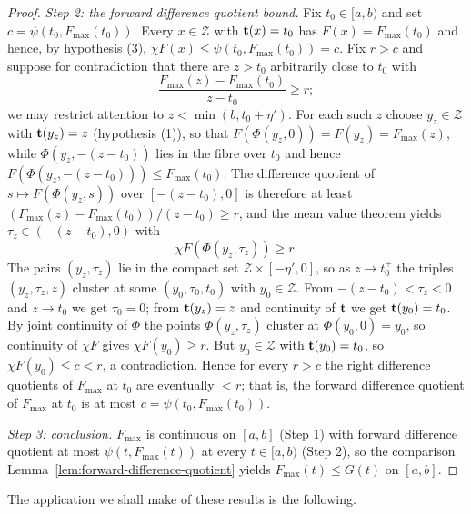 \begin{proof}
{\em Step 2: the forward difference quotient bound.} Fix $t_0\in[a,b)$
and set $c=\psi(t_0,F_{\mathrm{max}}(t_0))$. Every $x\in{\mathcal Z}$
with ${\bf t}(x)=t_0$ has $F(x)=F_{\mathrm{max}}(t_0)$ and hence, by
hypothesis (3), $\chi F(x)\le\psi(t_0,F_{\mathrm{max}}(t_0))=c$. Fix
$r>c$ and suppose for contradiction that there are $z>t_0$ arbitrarily
close to $t_0$ with
$$\frac{F_{\mathrm{max}}(z)-F_{\mathrm{max}}(t_0)}{z-t_0}\ge r;$$
we may restrict attention to $z<\min(b,t_0+\eta')$. For each such $z$
choose $y_z\in{\mathcal Z}$ with ${\bf t}(y_z)=z$ (hypothesis (1)), so
that $F(\Phi(y_z,0))=F(y_z)=F_{\mathrm{max}}(z)$, while
$\Phi(y_z,-(z-t_0))$ lies in the fibre over $t_0$ and hence
$F\left(\Phi(y_z,-(z-t_0))\right)\le F_{\mathrm{max}}(t_0)$. The
difference quotient of $s\mapsto F(\Phi(y_z,s))$ over $[-(z-t_0),0]$ is
therefore at least
$\left(F_{\mathrm{max}}(z)-F_{\mathrm{max}}(t_0)\right)/(z-t_0)\ge r$,
and the mean value theorem yields $\tau_z\in(-(z-t_0),0)$ with
$$\chi F\left(\Phi(y_z,\tau_z)\right)\ge r.$$
The pairs $(y_z,\tau_z)$ lie in the compact set
${\mathcal Z}\times[-\eta',0]$, so as $z\to t_0^+$ the triples
$(y_z,\tau_z,z)$ cluster at some $(y_0,\tau_0,t_0)$ with
$y_0\in{\mathcal Z}$. From $-(z-t_0)<\tau_z<0$ and $z\to t_0$ we get
$\tau_0=0$; from ${\bf t}(y_z)=z$ and continuity of ${\bf t}$ we get
${\bf t}(y_0)=t_0$. By joint continuity of $\Phi$ the points
$\Phi(y_z,\tau_z)$ cluster at $\Phi(y_0,0)=y_0$, so continuity of
$\chi F$ gives $\chi F(y_0)\ge r$. But $y_0\in{\mathcal Z}$ with
${\bf t}(y_0)=t_0$, so $\chi F(y_0)\le c<r$, a contradiction. Hence for
every $r>c$ the right difference quotients of $F_{\mathrm{max}}$ at
$t_0$ are eventually $<r$; that is, the forward difference quotient of
$F_{\mathrm{max}}$ at $t_0$ is at most $c=\psi(t_0,F_{\mathrm{max}}(t_0))$.

{\em Step 3: conclusion.} $F_{\mathrm{max}}$ is continuous on $[a,b]$
(Step 1) with forward difference quotient at most
$\psi(t,F_{\mathrm{max}}(t))$ at every $t\in[a,b)$ (Step 2), so the
comparison Lemma~\ref{lem:forward-difference-quotient} yields
$F_{\mathrm{max}}(t)\le G(t)$ on $[a,b]$.
\end{proof}


The application we shall make of these results is the following.


